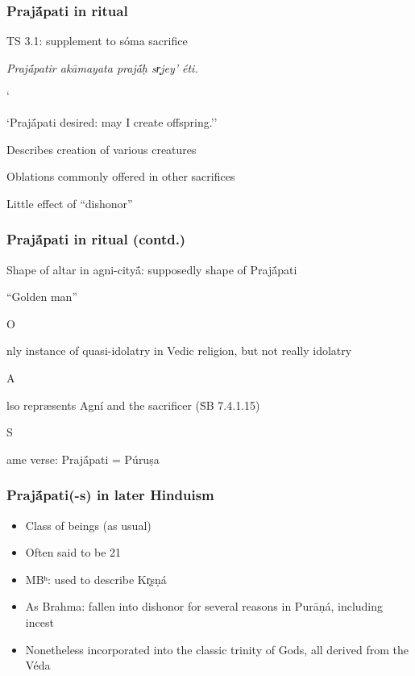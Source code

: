 \documentclass[pdf]{beamer}
\newcommand{\Subitem}[1]{{\setlength\itemindent{12pt} \item[-] #1}}
\newcommand{\Subsubitem}[1]{{\setlength\itemindent{24pt} \item[○] #1}}
\begin{document}
\begin{frame} \frametitle{Prajā́pati in ritual}
\begin{itemize}
	\item TS 3.1: supplement to sóma sacrifice
	\item \textit{Prajā́patir akāmayata prajā́ḥ sr̥jey’ éti.}
	\Subitem ``Prajā́pati desired: may I create offspring.''
	\item Describes creation of various creatures
	\item Oblations commonly offered in other sacrifices
	\item Little effect of ``dishonor''
\end{itemize}
\end{frame}

\begin{frame} \frametitle{Prajā́pati in ritual (contd.)}
\begin{itemize}
	\item Shape of altar in agni-cityā́: supposedly shape of Prajā́pati
	\item ``Golden man''
	\Subitem Only instance of quasi-idolatry in Vedic religion, but not really idolatry
	\Subsubitem Also repræsents Agní and the sacrificer (ṠB 7.4.1.15)
	\Subsubitem Same verse: Prajā́pati = Púruṣa
\end{itemize}
\end{frame}

\begin{frame} \frametitle{Prajā́pati(-s) in later Hinduism}
\begin{itemize}
	\item Class of beings (as usual)
	\item Often said to be 21
	\item MBʰ: used to describe Kr̥ṣṇá
	\item As Brahma: fallen into dishonor for several reasons in Purāṇá, including incest
	\item Nonetheless incorporated into the classic trinity of Gods, all derived from the Véda
\end{itemize}
\end{frame}
\end{document}
